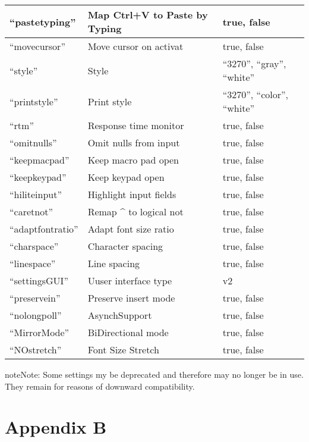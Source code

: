 \documentclass[letterpaper,10pt,english]{sphinxmanual}
\begin{document}
\begin{savenotes}
\begin{longtable}{|l|l|l|}
\hline
“pastetyping”
&
Map Ctrl+V to Paste
by Typing
&
true, false
\\
\hline
“movecursor”
&
Move cursor on activat
&
true, false
\\
\hline
“style”
&
Style
&
“3270”, “gray”, “white”
\\
\hline
“printstyle”
&
Print style
&
“3270”, “color”, “white”
\\
\hline
“rtm”
&
Response time monitor
&
true, false
\\
\hline
“omitnulls”
&
Omit nulls from input
&
true, false
\\
\hline
“keepmacpad”
&
Keep macro pad open
&
true, false
\\
\hline
“keepkeypad”
&
Keep keypad open
&
true, false
\\
\hline
“hiliteinput”
&
Highlight input fields
&
true, false
\\
\hline
“caretnot”
&
Remap \textasciicircum{} to logical not
&
true, false
\\
\hline
“adaptfontratio”
&
Adapt font size ratio
&
true, false
\\
\hline
“charspace”
&
Character spacing
&
true, false
\\
\hline
“linespace”
&
Line spacing
&
true, false
\\
\hline
“settingsGUI”
&
Uuser interface type
&
v2
\\
\hline
“preservein”
&
Preserve insert mode
&
true, false
\\
\hline
“nolongpoll”
&
AsynchSupport
&
true, false
\\
\hline
“MirrorMode”
&
BiDirectional mode
&
true, false
\\
\hline
“NOstretch”
&
Font Size Stretch
&
true, false
\\
\hline
\end{longtable}\sphinxatlongtableend\end{savenotes}


\begin{sphinxadmonition}{note}{Note:}
Some settings my be deprecated and therefore may no longer be in use. They remain for reasons of downward compatibility.
\end{sphinxadmonition}


\chapter{Appendix B}
\label{\detokenize{TN202002:appendix-b}}
\end{document}

